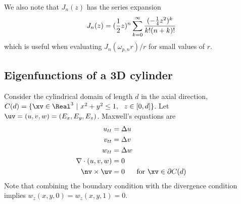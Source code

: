 \documentclass[10pt]{article}
\newcommand{\grad}{\nabla}
\begin{document}
We also note that $J_n(z)$ has the series expansion
\[
   J_n(z) = ({1\over 2}z)^n \sum_{k=0}^\infty { (-{1\over 4} z^2)^k \over k! (n+k)! }
\]
which is useful when evaluating $J_n(\omega_{p,n} r )/r$ for small values of $r$.


\subsection{Eigenfunctions of a 3D cylinder}\label{sec:cylinderEigenfunctions}

Consider the cylindrical domain of length $d$ in the axial direction,
$C(d)=\{ \xv\in \Real^3 ~|~ x^2+y^2 \le 1,~~ z\in[0,d] \}$.
Let $\uv=(u,v,w)=(E_x,E_y,E_z)$. Maxwell's equations are
\begin{align*}
  u_{tt} & = \Delta u \\
  v_{tt} & = \Delta v \\
  w_{tt} & = \Delta w \\
  \grad\cdot (u,v,w) &= 0 \\
  \nv\times\uv&=0 ~~ \quad\mbox{for $\xv\in\partial C(d)$}
\end{align*}
Note that combining the boundary condition with the divergence condition implies
$w_z(x,y,0)=w_z(x,y,1)=0$.
\end{document}
